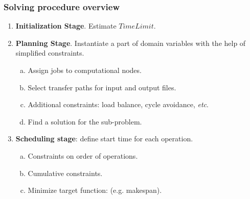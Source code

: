 \documentclass{beamer}
\begin{document}
\begin{frame}\frametitle{Solving procedure overview}

\begin{enumerate}
\item \textbf{Initialization Stage}. Estimate $TimeLimit$.
\item \textbf{Planning Stage}. Instantiate a part of domain variables with the help of simplified constraints.     
	\begin{enumerate}[a.]
	\item Assign jobs to computational nodes. 
	\item Select transfer paths for input and output files. 
	\item Additional constraints: load balance, cycle avoidance, \textit{etc}.
	\item Find a solution for the sub-problem.
	\end{enumerate}
\item \textbf{Scheduling stage}: define start time for each operation. 
	\begin{enumerate} [a.]
	\item Constraints on order of operations. 
	\item Cumulative constraints.
	\item Minimize target function: (e.g. makespan).
	\end{enumerate}
\end{enumerate}
\end{frame}
\end{document}
